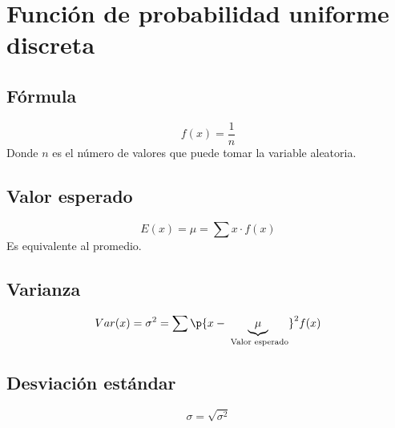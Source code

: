 \documentclass{article}
\begin{document}
\section{Función de probabilidad uniforme discreta}
\subsection{Fórmula} 
        \[
          f(x) = \frac{1}{n} 
        \] Donde $n$ es el número de valores que puede tomar la variable aleatoria. 
    
\subsection{Valor esperado}
\[
    E(x) = \mu = \sum x \cdot f(x) 
\] Es equivalente al promedio. 

\subsection{Varianza} 
\[
    Var(x) = \sigma ^2 = \sum \p{x-\underbrace{\mu}_{\text{ Valor esperado} } } ^2 f(x)
\]
    
\subsection{Desviación estándar}
\[
    \sigma = \sqrt{\sigma^2} 
\]


\hrulefill
\end{document}
